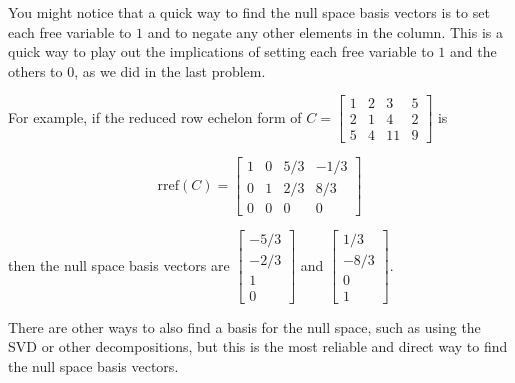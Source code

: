\documentclass{ximera}
\begin{document}
\begin{remark}

    You might notice that a quick way to find the null space basis vectors is to set each free variable to $1$ and to negate any other elements in the column. This is a quick way to play out the implications of setting each free variable to $1$ and the others to $0$, as we did in the last problem.

    For example, if the reduced row echelon form of $C=\begin{bmatrix} 1 & 2 & 3 & 5 \\ 2 & 1 & 4 &2 \\ 5 & 4 & 11 & 9 \end{bmatrix}$ is 

    $$\text{rref}(C)=\begin{bmatrix} 1 & 0 & 5/3 & -1/3 \\ 0 & 1 & 2/3 & 8/3 \\ 0 & 0 & 0 & 0 \end{bmatrix}$$

    then the null space basis vectors are $\begin{bmatrix} -5/3 \\ -2/3 \\ 1 \\ 0 \end{bmatrix}$ and $\begin{bmatrix} 1/3 \\ -8/3 \\ 0 \\ 1 \end{bmatrix}$.

    There are other ways to also find a basis for the null space, such as using the SVD or other decompositions, but this is the most reliable and direct way to find the null space basis vectors.

\end{remark}
\end{document}
